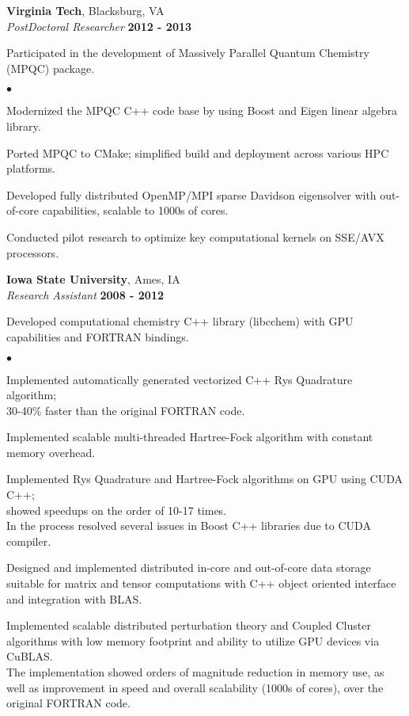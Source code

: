 \documentclass[overlap,line]{cv}
\newenvironment{list2}{
  \begin{list}{$\bullet$}{%
      \setlength{\itemsep}{0in}
      \setlength{\parsep}{0in} \setlength{\parskip}{0in}
      \setlength{\topsep}{0in} \setlength{\partopsep}{0in} 
      \setlength{\leftmargin}{0.2in}}}{\end{list}}
\begin{document}
\begin{resume}
\newpage

{\bf Virginia Tech}, Blacksburg, VA \\
{\it PostDoctoral Researcher} \hfill {\bf 2012 - 2013}

Participated in the development of Massively Parallel Quantum Chemistry (MPQC) package.
\vspace{.05in}
\begin{list2}
\item Modernized the MPQC C++ code base by using Boost and Eigen linear algebra library.
\item Ported MPQC to CMake; simplified build and deployment across various HPC platforms.
\item Developed fully distributed OpenMP/MPI sparse Davidson eigensolver
  with out-of-core capabilities, scalable to 1000s of cores.
\item Conducted pilot research to optimize key computational kernels on SSE/AVX processors.
\end{list2}


{\bf Iowa State University}, Ames, IA \\
{\it Research Assistant} \hfill {\bf 2008 - 2012}

Developed computational chemistry C++ library (libcchem) with GPU capabilities
and FORTRAN bindings.
\vspace{.05in}
\begin{list2}
\item Implemented automatically generated vectorized C++ Rys Quadrature algorithm; \\
  30-40\% faster than the original FORTRAN code.
\item Implemented scalable multi-threaded Hartree-Fock algorithm with constant memory overhead.
\item Implemented Rys Quadrature and Hartree-Fock algorithms on GPU using CUDA C++; \\
  showed speedups on the order of 10-17 times.\\
  In the process resolved several issues in Boost C++ libraries due to CUDA compiler.
\item Designed and implemented distributed in-core and out-of-core
  data storage suitable for matrix and tensor computations with C++
  object oriented interface and integration with BLAS.
\item Implemented scalable distributed perturbation theory and Coupled Cluster
  algorithms with low memory footprint and ability to utilize GPU devices via CuBLAS. \\
  The implementation showed orders of magnitude reduction in memory use, as
  well as improvement in speed and overall scalability (1000s of cores),
  over the original FORTRAN code.
\end{list2}



\end{resume}
\end{document}
